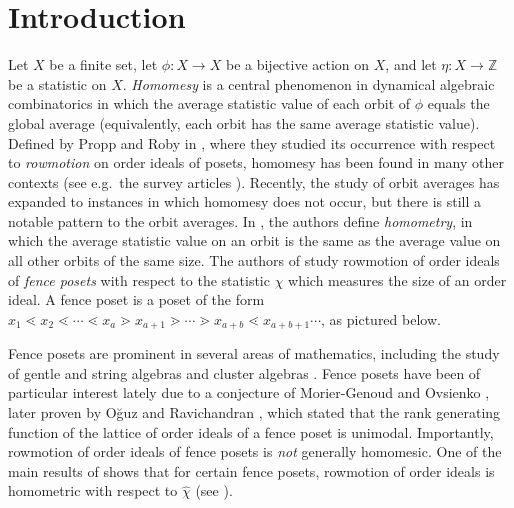 \documentclass[11pt]{amsart}
\theoremstyle{definition}
\begin{document}
\section{Introduction}
\label{sec:intro}
Let $X$ be a finite set, let $\phi:X\to X$ be a bijective action on $X$, and let $\eta:X\rightarrow \mathbb{Z}$ be a statistic on $X$.
\emph{Homomesy} is a central phenomenon in dynamical algebraic combinatorics in which the average statistic value of each orbit of $\phi$ equals the global average
(equivalently, each orbit has the same average statistic value).  
Defined by  Propp and Roby in  \cite{PR2015}, where they studied its occurrence with respect to \emph{rowmotion} on order ideals of  posets, homomesy has been found in many other contexts (see e.g.~the survey articles \cite{Roby2016,Striker2017}). Recently, the study of orbit averages has expanded to instances in which homomesy does not occur, but there is still a notable pattern to the orbit averages. In \cite{elizalde2021rowmotion}, the authors define \emph{homometry}, in which the average statistic value on an orbit is the same as the average value on all other orbits of the same size. 
The authors of \cite{elizalde2021rowmotion} study rowmotion of order ideals of \emph{fence posets} with respect to the statistic $\hat{\chi}$ which measures the size of an order ideal.
A fence poset is a poset of the form $x_1 \lessdot x_2 \lessdot \cdots \lessdot x_a \gtrdot x_{a+1} \gtrdot \cdots \gtrdot x_{a+b} \lessdot x_{a+b+1} \cdots$, as pictured below.
\begin{center}
\end{center}
Fence posets are prominent in several areas of mathematics, including the study of gentle and string algebras and cluster algebras \cite{ccanakcci2018cluster}. Fence posets have been of particular interest lately due to a conjecture of Morier-Genoud and Ovsienko \cite{morier2020continued}, later proven by O{\u{g}}uz and Ravichandran \cite{ouguz2023rank}, which stated that the rank generating function of the lattice of order ideals of a fence poset is unimodal.
Importantly, rowmotion of order ideals of fence posets is \emph{not} generally homomesic.
One of the main results of \cite{elizalde2021rowmotion} shows  that for certain fence posets, rowmotion of order ideals is homometric with respect to $\hat{\chi}$ (see \cite[Theorem~4.5]{elizalde2021rowmotion}).
\end{document}
